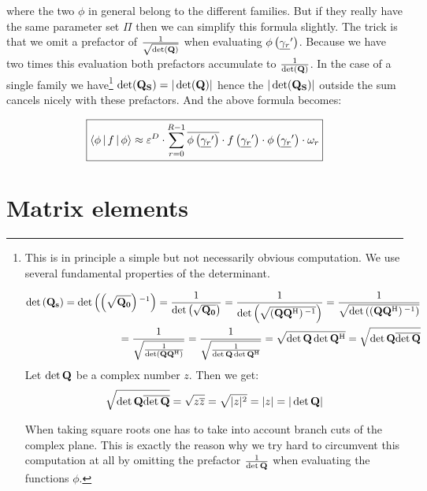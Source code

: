where the two $\phi$ in general belong to the different families. But if they really
have the same parameter set $\Pi$ then we can simplify this formula slightly. The
trick is that we omit a prefactor of $\frac{1}{\sqrt{\det(\mathbf{Q})}}$ when evaluating
$\phi\left( \underline{\gamma_r}^\prime \right)$. Because we have two times this evaluation both
prefactors accumulate to $\frac{1}{\det(\mathbf{Q})}$. In the case of a single family
we have\footnote{
This is in principle a simple but not necessarily obvious computation.
We use several fundamental properties of the determinant.

\begin{equation*}
\begin{split}
  \det\left(\mathbf{Q_s}\right)
  = \det\left(\left(\sqrt{\mathbf{Q_0}}\right){}^{-1}\right)
  = \frac{1}{\det\left(\sqrt{\mathbf{Q_0}}\right)}
  = \frac{1}{\det\left(\sqrt{\left(\mathbf{Q}\mathbf{Q}{}^{\textnormal{H}}\right){}^{-1}}\right)}
  = \frac{1}{\sqrt{\det\left(\left(\mathbf{Q}\mathbf{Q}{}^{\textnormal{H}}\right){}^{-1}\right)}} \\
  = \frac{1}{\sqrt{\frac{1}{\det\left(\mathbf{Q}\mathbf{Q}{}^{\textnormal{H}}\right)}}}
  = \frac{1}{\sqrt{\frac{1}{\det\mathbf{Q}\det\mathbf{Q}{}^{\textnormal{H}}}}}
  = \sqrt{\det\mathbf{Q}\det\mathbf{Q}{}^{\textnormal{H}}}
  = \sqrt{\det\mathbf{Q}\overline{\det\mathbf{Q}}}
\end{split}
\end{equation*}
Let $\det\mathbf{Q}$ be a complex number $z$. Then we get:
\begin{equation*}
  \sqrt{\det\mathbf{Q}\overline{\det\mathbf{Q}}}
  = \sqrt{z\overline{z}}
  = \sqrt{|z|^2} = |z| = |\det\mathbf{Q}|
\end{equation*}

When taking square roots one has to take into account branch cuts of the complex
plane. This is exactly the reason why we try hard to circumvent this computation at all
by omitting the prefactor $\frac{1}{\det\mathbf{Q}}$ when evaluating the functions $\phi$.
} $\det(\mathbf{Q_S}) = |\det(\mathbf{Q})|$ hence the $|\det(\mathbf{Q_S})|$ outside the
sum cancels nicely with these prefactors. And the above formula becomes:

\begin{equation}
\boxed{
\begin{split}
  \Braket{\phi | f | \phi}
  \approx
  \varepsilon^D \cdot \sum_{r=0}^{R-1} \overline{\phi\left( \underline{\gamma_r}^\prime \right)} \cdot f\left( \underline{\gamma_r}^\prime \right) \cdot \phi\left( \underline{\gamma_r}^\prime \right) \cdot \omega_r
\end{split}
}
\end{equation}


\section{Matrix elements}


